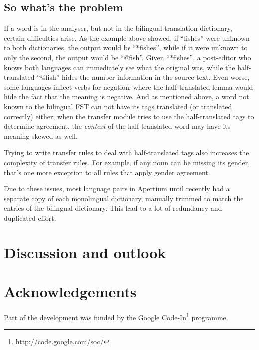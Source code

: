 \documentclass[11pt]{article}
\begin{document}
\subsection{So what's the problem}

If a word is in the analyser, but not in the bilingual translation
dictionary, certain difficulties arise. As the example above showed,
if ``fishes'' were unknown to both dictionaries, the output would be
``*fishes'', while if it were unknown to only the second, the output
would be ``@fish''. Given ``*fishes'', a post-editor who knows both
languages can immediately see what the original was, while the
half-translated ``@fish'' hides the number information in the source
text. Even worse, some languages inflect verbs for negation, where the
half-translated lemma would hide the fact that the meaning is
negative. And as mentioned above, a word not known to the bilingual
FST can not have its tags translated (or translated correctly) either;
when the transfer module tries to use the half-translated tags to
determine agreement, the \emph{context} of the half-translated word
may have its meaning skewed as well.

Trying to write transfer rules to deal with half-translated tags also
increases the complexity of transfer rules. For example, if any noun
can be missing its gender, that's one more exception to all rules that
apply gender agreement.

Due to these issues, most language pairs in Apertium until recently
had a separate copy of each monolingual dictionary, manually trimmed
to match the entries of the bilingual dictionary. This lead to a
lot of redundancy and duplicated effort.



\section{Discussion and outlook}
\section*{Acknowledgements}
Part of the development was funded by the Google
Code-In\footnote{\href{http://code.google.com/soc/}{http://code.google.com/soc/}
} programme.




\end{document}
